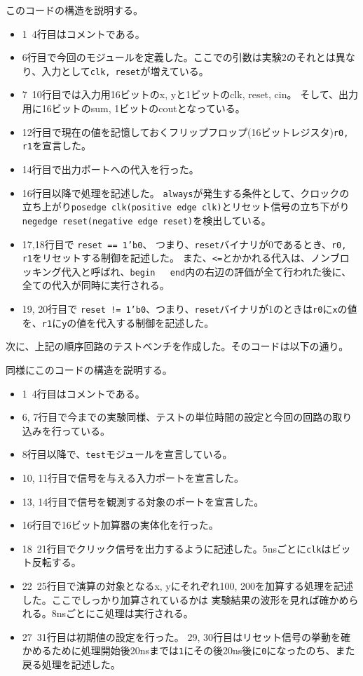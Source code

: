 \documentclass[uplatex]{jsarticle}
\begin{document}
このコードの構造を説明する。

\begin{itemize}
  \item 1~4行目はコメントである。
  \item 6行目で今回のモジュールを定義した。ここでの引数は実験2のそれとは異なり、入力として{\tt clk, reset}が増えている。
  \item 7~10行目では入力用16ビットのx, yと1ビットのclk, reset, cin。
          そして、出力用に16ビットのsum, 1ビットのcoutとなっている。
  \item 12行目で現在の値を記憶しておくフリップフロップ(16ビットレジスタ){\tt r0, r1}を宣言した。
  \item 14行目で出力ポートへの代入を行った。
  \item 16行目以降で処理を記述した。
	  {\tt always}が発生する条件として、クロックの立ち上がり{\tt posedge clk(positive edge clk)}とリセット信号の立ち下がり{\tt negedge reset(negative edge reset)}を検出している。
  \item 17,18行目で {\tt reset == 1'b0}、 つまり、{\tt reset}バイナリが0であるとき、{\tt r0, r1}をリセットする制御を記述した。
	  また、{\tt <=}とかかれる代入は、ノンブロッキング代入と呼ばれ、{\tt begin ~ end}内の右辺の評価が全て行われた後に、全ての代入が同時に実行される。
  \item 19, 20行目で {\tt reset != 1'b0}、つまり、{\tt reset}バイナリが1のときは{\tt r0}に{\tt x}の値を、{\tt r1}に{\tt y}の値を代入する制御を記述した。
\end{itemize}

次に、上記の順序回路のテストベンチを作成した。そのコードは以下の通り。



同様にこのコードの構造を説明する。

\begin{itemize}
  \item 1~4行目はコメントである。
  \item 6, 7行目で今までの実験同様、テストの単位時間の設定と今回の回路の取り込みを行っている。
  \item 8行目以降で、{\tt test}モジュールを宣言している。
  \item 10, 11行目で信号を与える入力ポートを宣言した。
  \item 13, 14行目で信号を観測する対象のポートを宣言した。
  \item 16行目で16ビット加算器の実体化を行った。
  \item 18~21行目でクリック信号を出力するように記述した。5nsごとに{\tt clk}はビット反転する。
  \item 22~25行目で演算の対象となるx, yにそれぞれ100, 200を加算する処理を記述した。ここでしっかり加算されているかは
          実験結果の波形を見れば確かめられる。8nsごとにこ処理は実行される。
  \item 27~31行目は初期値の設定を行った。
           29, 30行目はリセット信号の挙動を確かめるために処理開始後20nsまでは{\tt 1}にその後20ns後に{\tt 0}になったのち、また戻る処理を記述した。
\end{itemize}
\end{document}
